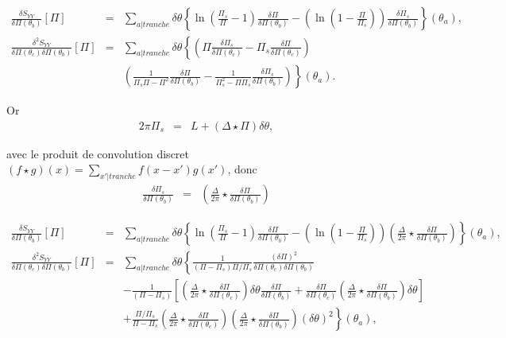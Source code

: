 \begin{eqnarray}
			\frac{ \delta S_{YY} }{ \delta \Pi(\theta_b)  } [\Pi ]  & = & \sum_{a\vert tranche}   \delta \theta \left \{ \ln \left ( \frac{ \Pi_s}{ \Pi  } - 1 \right )\frac{\delta \Pi  }{ \delta \Pi(\theta_b)} -  \left ( \ln \left ( 1 - \frac{ \Pi}{ \Pi_s }\right ) \right )\frac{\delta \Pi_s  }{ \delta \Pi(\theta_b) } \right \} (\theta_a) ,\\
			\frac{ \delta^2 S_{YY} }{ \delta \Pi(\theta_c) \delta \Pi(\theta_b)  } [\Pi ]  & = & 	\sum_{a \vert tranche}   \delta \theta \left \{ \left ( \Pi  \frac{\delta \Pi_s  }{\delta \Pi ( \theta_c) }- \Pi_s  \frac{\delta \Pi  }{\delta \Pi ( \theta_c ) } \right ) \right.   \\
			&&   \left. \left ( \frac{1}{\Pi_s\Pi  -\Pi^2  }\frac{\delta \Pi }{\delta \Pi(\theta_b) }- \frac{1}{\Pi_s^2  - \Pi \Pi_s }\frac{\delta \Pi_s }{\delta \Pi(\theta_b) } \right )  \right \}(\theta_a).
		\end{eqnarray}
		
	Or 
	\begin{eqnarray}
		2\pi \Pi_s  & = &  L + ( \Delta \star \Pi ) \delta \theta, 		
	\end{eqnarray}
	
	avec le produit de convolution discret $( f \star g )(x) = \sum_{x'\vert tranche } f( x - x') g(x') $, donc 
	\begin{eqnarray}
			\frac{\delta \Pi_s }{\delta \Pi( \theta_b)}   & = &\left  ( \frac{\Delta}{2\pi} \star \frac{\delta \Pi}{\delta \Pi(\theta_b) }  \right )	
		\end{eqnarray}
	
	\begin{eqnarray}
			\frac{ \delta S_{YY} }{ \delta \Pi(\theta_b)} [\Pi ]  & = & \sum_{a\vert tranche}   \delta \theta \left \{ \ln \left ( \frac{ \Pi_s }{ \Pi} - 1 \right )\frac{\delta \Pi }{ \delta \Pi (\theta_b) } -  \left ( \ln \left ( 1 - \frac{ \Pi}{ \Pi_s}\right ) \right ) \left ( \frac{ \Delta}{2 \pi} \star \frac{\delta \Pi }{ \delta \Pi(\theta_b) }  \right) \right \} ( \theta_	a ),\\
			\frac{ \delta^2 S_{YY} }{ \delta \Pi(\theta_c) \delta \Pi(\theta_b)  } [\Pi ]  & = & \sum_{a \vert tranche}   \delta \theta \left \{  \frac{1}{(\Pi  - \Pi_s)\Pi/\Pi_s} \frac{(\delta \Pi)^2}{ \delta \Pi(\theta_c) \delta \Pi(\theta_b)  } \right . \\
		&  &  -  \left . \frac{1 }{(\Pi -\Pi_s) } \left [ \left (  \frac{\Delta}{2\pi} \star\frac{\delta \Pi}{\delta \Pi(\theta_c)}   \right )   \delta \theta \frac{\delta \Pi}{\delta \Pi(\theta_b)}+ \frac{\delta \Pi}{\delta \Pi(\theta_c)} \left (  \frac{\Delta}{2\pi} \star\frac{\delta \Pi}{\delta \Pi(\theta_b)} \right )  \delta \theta  \right ] \right . \\
		& & + \left .  \frac{\Pi/\Pi_s }{\Pi - \Pi_s }\left (  \frac{\Delta}{2\pi} \star\frac{\delta \Pi}{\delta \Pi(\theta_c)} \right )\left (  \frac{\Delta}{2\pi} \star\frac{\delta \Pi}{\delta \Pi(\theta_b)} \right )   (\delta \theta)^2 \right \}(\theta_a),	
	\end{eqnarray}
	
